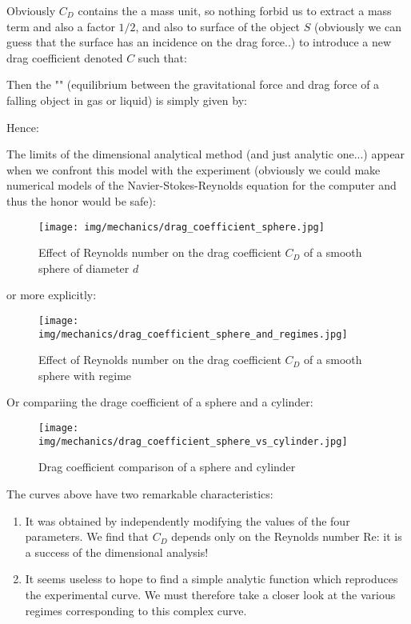 	\begin{tcolorbox}[title=Remark,colframe=black,arc=10pt]
	 Obviously $C_D$ contains the a mass unit, so nothing forbid us to extract a mass term and also a factor $1/2$, and also to surface of the object $S$ (obviously we can guess that the surface has an incidence on the drag force..) to introduce a new drag coefficient denoted $C$ such that:
	
	Then the "" (equilibrium between the gravitational force and drag force of a falling object in gas or liquid) is simply given by:
	
	Hence:
	
	\end{tcolorbox}
	The limits of the dimensional analytical method (and just analytic one...) appear when we confront this model with the experiment (obviously we could make numerical models of the Navier-Stokes-Reynolds equation for the computer and thus the honor would be safe):
	\begin{figure}[H]
		\centering
		\texttt{[image: img/mechanics/drag\_coefficient\_sphere.jpg]}
		\caption{Effect of Reynolds number on the drag coefficient $C_D$ of a smooth sphere of diameter $d$}
	\end{figure}
	or more explicitly:
	\begin{figure}[H]
		\centering
		\texttt{[image: img/mechanics/drag\_coefficient\_sphere\_and\_regimes.jpg]}
		\caption{Effect of Reynolds number on the drag coefficient $C_D$ of a smooth sphere with regime}
	\end{figure}
	Or compariing the drage coefficient of a sphere and a cylinder:
	\begin{figure}[H]
		\centering
		\texttt{[image: img/mechanics/drag\_coefficient\_sphere\_vs\_cylinder.jpg]}
		\caption{Drag coefficient comparison of a sphere and cylinder}
	\end{figure}
	The curves above have two remarkable characteristics:
	\begin{enumerate}
		\item It was obtained by independently modifying the values of the four parameters. We find that $C_D$ depends only on the Reynolds number Re: it is a success of the dimensional analysis!

		\item It seems useless to hope to find a simple analytic function which reproduces the experimental curve. We must therefore take a closer look at the various regimes corresponding to this complex curve.
	\end{enumerate}
